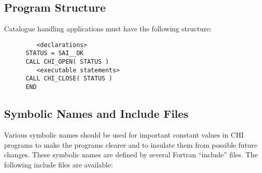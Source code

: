 \subsection{Program Structure}

Catalogue handling applications must have the following structure: 

\begin{verbatim}
         <declarations>
      STATUS = SAI__OK
      CALL CHI_OPEN( STATUS )
         <executable statements>
      CALL CHI_CLOSE( STATUS )
      END
\end{verbatim}

\subsection{Symbolic Names and Include Files}

Various symbolic names should be used for important constant values in CHI
programs to make the programs clearer and to insulate them from possible future
changes. These symbolic names are defined by several Fortran ``include'' files.
The following include files are available: 

